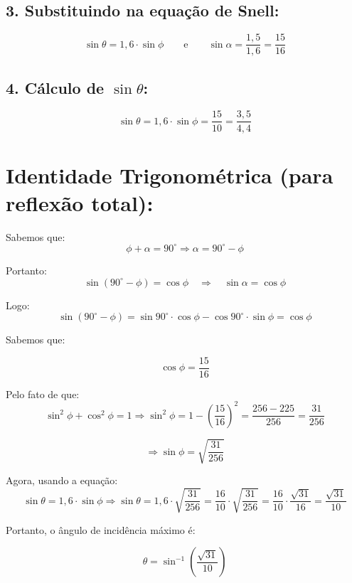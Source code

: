 \begin{flushleft}
\subsection*{3. Substituindo na equação de Snell:}
\[
\sin \theta = 1{,}6 \cdot \sin \phi
\qquad
\text{e}
\qquad
\sin \alpha = \frac{1{,}5}{1{,}6} = \frac{15}{16}
\]

\subsection*{4. Cálculo de $\sin \theta$:}
\[
\sin \theta = 1{,}6 \cdot \sin \phi = \frac{15}{10} = \frac{3{,}5}{4{,}4}
\]

\section*{Identidade Trigonométrica (para reflexão total):}

Sabemos que:
\[
\phi + \alpha = 90^\circ
\Rightarrow \alpha = 90^\circ - \phi
\]

Portanto:
\[
\sin (90^\circ - \phi) = \cos \phi
\quad \Rightarrow \quad
\sin \alpha = \cos \phi
\]

Logo:
\[
\sin(90^\circ - \phi) = \sin 90^\circ \cdot \cos \phi - \cos 90^\circ \cdot \sin \phi = \cos \phi
\]

Sabemos que:

\[
\cos \phi = \frac{15}{16}
\]

Pelo fato de que:
\[
\sin^2 \phi + \cos^2 \phi = 1
\Rightarrow \sin^2 \phi = 1 - \left(\frac{15}{16}\right)^2
= \frac{256 - 225}{256} = \frac{31}{256}
\]

\[
\Rightarrow \sin \phi = \sqrt{\frac{31}{256}}
\]

Agora, usando a equação:
\[
\sin \theta = 1{,}6 \cdot \sin \phi
\Rightarrow \sin \theta = 1{,}6 \cdot \sqrt{\frac{31}{256}}
= \frac{16}{10} \cdot \sqrt{\frac{31}{256}}
= \frac{16}{10} \cdot \frac{\sqrt{31}}{16}
= \frac{\sqrt{31}}{10}
\]

Portanto, o ângulo de incidência máximo é:

\[
\boxed{
\theta = \sin^{-1} \left( \frac{\sqrt{31}}{10} \right)
}
\]

\end{flushleft}

